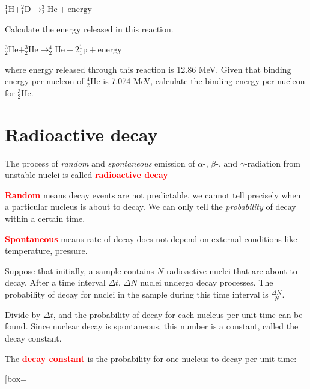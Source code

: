 \documentclass[a4paper,12pt]{book}
\newenvironment{ilight}
  {\centering
  	\vspace*{6pt}
  	\begin{tcolorbox}[colframe=Gray,colback=LightGrey!15]
  \setlength{\baselineskip}{\baselineskip}%
  }
  {\end{tcolorbox}\vspace*{-4pt}}
\newcommand{\keypoint}[1]{\textbf{\textcolor{red}{#1}}}
\newcommand{\tcbhighmath}[1]{\boxed{#1}}
\newcommand{\keypoint}[1]{\textbf{\textcolor{red}{#1}}}
\begin{document}
{

\centering

$ ^1_1\text{H} + ^2_1\text{D} \longrightarrow ^3_2\text{He} + \text{energy}$

}
	
\noindent Calculate the energy released in this reaction.

\newpage

{
	
	\centering

	$^3_2\text{He} + ^3_2\text{He} \longrightarrow ^4_2\text{He} + 2 ^1_1\text{p} +\text{energy}$	
	
}

\noindent where energy released through this reaction is 12.86 MeV. Given that binding energy per nucleon of $^4_2\text{He}$ is 7.074 MeV, calculate the binding energy per nucleon for $^3_2\text{He}$.

\section{Radioactive decay}

\begin{ilight}
	The process of \emph{random} and \emph{spontaneous} emission of $\alpha$-, $\beta$-, and $\gamma$-radiation from unstable nuclei is called \keypoint{radioactive decay}
\end{ilight}

\keypoint{Random} means decay events are not predictable, we cannot tell precisely when a particular nucleus is about to decay. We can only tell the \emph{probability} of decay within a certain time.

\keypoint{Spontaneous} means rate of decay does not depend on external conditions like temperature, pressure.

\vspace*{\baselineskip}

Suppose that initially, a sample contains $N$ radioactive nuclei that are about to decay. After a time interval $\Delta t$, $\Delta N$ nuclei undergo decay processes. The probability of decay for nuclei in the sample during this time interval is $\frac{\Delta N}{N}$.

Divide by $\Delta t$, and the probability of decay for each nucleus per unit time can be found. Since nuclear decay is spontaneous, this number is a constant, called the decay constant.

\begin{ilight}
	The \keypoint{decay constant} is the probability for one nucleus to decay per unit time: \begin{empheq}[box=\tcbhighmath]{equation*}{\lambda = \frac{\Delta N}{N\Delta t}}\end{empheq}
\end{ilight}
\end{document}
